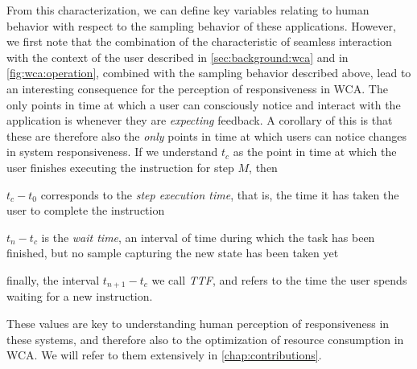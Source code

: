 %
From this characterization, we can define key variables relating to human behavior with respect to the sampling behavior of these applications.
However, we first note that the combination of the characteristic of seamless interaction with the context of the user described in \cref{sec:background:wca} and in \cref{fig:wca:operation}, combined with the sampling behavior described above, lead to an interesting consequence for the perception of responsiveness in \gls{WCA}.
The only points in time at which a user can consciously notice and interact with the application is whenever they are \emph{expecting} feedback.
A corollary of this is that these are therefore also the \emph{only} points in time at which users can notice changes in system responsiveness.
If we understand \ensuremath{t_c} as the point in time at which the user finishes executing the instruction for step \ensuremath{M}, then
\begin{inlineenum}
    \item \ensuremath{t_c - t_0} corresponds to the \emph{step execution time}, that is, the time it has taken the user to complete the instruction
    \item \ensuremath{t_n - t_c} is the \emph{wait time}, an interval of time during which the task has been finished, but no sample capturing the new state has been taken yet
    \item finally, the interval \ensuremath{t_{n + 1} - t_c} we call \emph{\gls{TTF}}, and refers to the time the user spends waiting for a new instruction.
\end{inlineenum}
These values are key to understanding human perception of responsiveness in these systems, and therefore also to the optimization of resource consumption in \gls{WCA}.
We will refer to them extensively in \cref{chap:contributions}.

